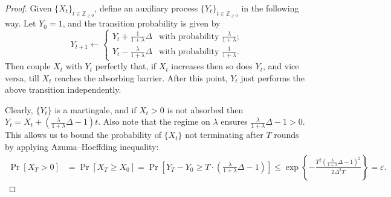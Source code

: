 \documentclass[10pt,a4paper]{article}
\newtheorem{lemma}{Lemma}[section]
\renewcommand{\Pr}{\mathop{\mathrm{Pr}}\nolimits}
\begin{document}
\begin{proof}
Given $\{X_t\}_{t\in\mathbb{Z}_{\geq 0}}$, define an auxiliary process $\{Y_t\}_{t\in\mathbb{Z}_{\geq 0}}$ in the following way.
Let $Y_0=1$, and the transition probability is given by
\begin{equation}
  Y_{t+1}\leftarrow\begin{cases}
  Y_t+\frac{1}{1+\lambda}\Delta & \text{with probability } \frac{\lambda}{1+\lambda}; \\
  Y_t-\frac{\lambda}{1+\lambda}\Delta & \text{with probability } \frac{1}{1+\lambda}. 
  \end{cases}
\end{equation}
Then couple $X_t$ with $Y_t$ perfectly that, if $X_t$ increases then so does $Y_t$, and vice versa, till $X_t$ reaches the absorbing barrier. 
After this point, $Y_t$ just performs the above transition independently. 

Clearly, $\{Y_t\}$ is a martingale, and if $X_t>0$ is not absorbed then 
$Y_t=X_t+\left(\frac{\lambda}{1+\lambda}\Delta-1\right)t$. 
Also note that the regime on $\lambda$ ensures $\frac{\lambda}{1+\lambda}\Delta-1>0$. 
This allows us to bound the probability of $\{X_t\}$ not terminating after $T$ rounds by applying Azuma--Hoeffding inequality:  
\begin{align*}
\Pr[X_T>0]&=\Pr[X_T\geq X_0]=\Pr\left[Y_T-Y_0\geq T\cdot\left(\frac{\lambda}{1+\lambda}\Delta-1\right)\right]\leq\exp\left\{-\frac{T^2\left(\frac{\lambda}{1+\lambda}\Delta-1\right)^2}{2\Delta^2 T}\right\}=\varepsilon.%
\end{align*}
\end{proof}

%
%
\end{document}
